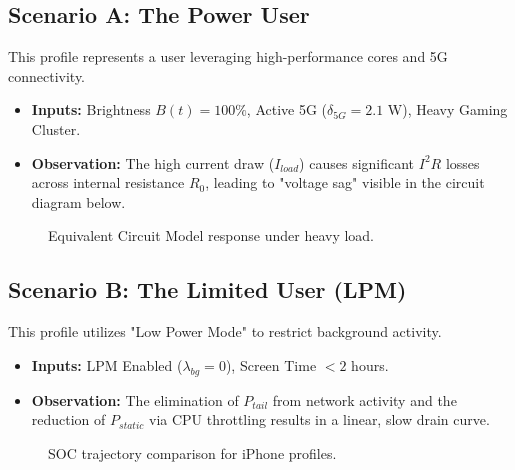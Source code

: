 \documentclass[12pt]{article}
\begin{document}
\subsection{Scenario A: The Power User}
This profile represents a user leveraging high-performance cores and 5G connectivity.
\begin{itemize}
    \item \textbf{Inputs:} Brightness $B(t) = 100\%$, Active 5G ($\delta_{5G} = 2.1$ W), Heavy Gaming Cluster.
    \item \textbf{Observation:} The high current draw ($I_{load}$) causes significant $I^2R$ losses across internal resistance $R_0$, leading to "voltage sag" visible in the circuit diagram below.
\end{itemize}

\begin{figure}[h]
    \centering
    \caption{Equivalent Circuit Model response under heavy load.}
    \label{fig:iphone_circuit}
\end{figure}

\subsection{Scenario B: The Limited User (LPM)}
This profile utilizes "Low Power Mode" to restrict background activity.
\begin{itemize}
    \item \textbf{Inputs:} LPM Enabled ($\lambda_{bg} = 0$), Screen Time $< 2$ hours.
    \item \textbf{Observation:} The elimination of $P_{tail}$ from network activity and the reduction of $P_{static}$ via CPU throttling results in a linear, slow drain curve.
\end{itemize}

\begin{figure}[h]
    \centering
    \caption{SOC trajectory comparison for iPhone profiles.}
    \label{fig:iphone_soc}
\end{figure}

\newpage
\end{document}
